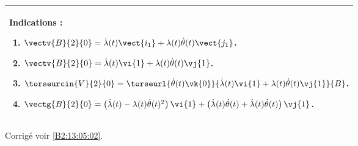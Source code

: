 \ifprof
\else
\footnotesize
\begin{center}
\begin{tabular}{|p{.9\linewidth}|}
\hline
Indications :
\begin{enumerate}
\item $\vectv{B}{2}{0} =\dot{\lambda}(t)\vect{i_1}+\lambda(t)\dot{\theta}(t)\vect{j_1}$.
\item $\vectv{B}{2}{0}=\dot{\lambda}(t)\vi{1}+\lambda(t)\dot{\theta}(t)\vj{1}$.
\item $\torseurcin{V}{2}{0} =\torseurl{\dot{\theta}(t)\vk{0}}{\dot{\lambda}(t)\vi{1}+\lambda(t)\dot{\theta}(t)\vj{1}}{B}$.
\item $\vectg{B}{2}{0} =  \left( \ddot{\lambda}(t)-\lambda(t)\dot{\theta}(t)^2\right)\vi{1}  +  \left( \dot{\lambda}(t)\dot{\theta}(t) +\dot{\lambda}(t)\dot{\theta}(t)\right) \vj{1}$.
\end{enumerate} \\ \hline
\end{tabular}
\end{center}
\normalsize

\begin{flushright}
\footnotesize{Corrigé  voir \ref{B2:13:05:02}.}
\end{flushright}%
\fi